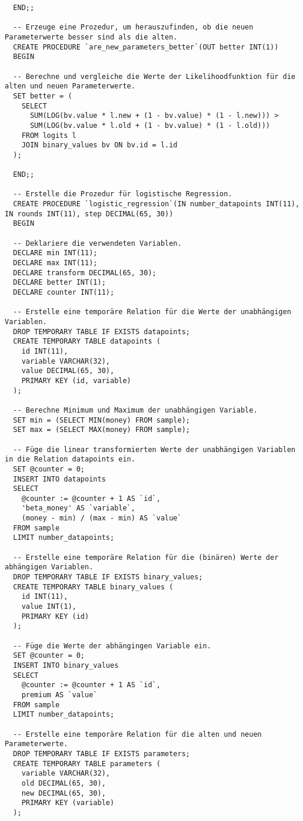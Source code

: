 \begin{verbatim}
  END;;

  -- Erzeuge eine Prozedur, um herauszufinden, ob die neuen Parameterwerte besser sind als die alten.
  CREATE PROCEDURE `are_new_parameters_better`(OUT better INT(1))
  BEGIN

  -- Berechne und vergleiche die Werte der Likelihoodfunktion für die alten und neuen Parameterwerte.
  SET better = (
    SELECT
      SUM(LOG(bv.value * l.new + (1 - bv.value) * (1 - l.new))) >
      SUM(LOG(bv.value * l.old + (1 - bv.value) * (1 - l.old)))
    FROM logits l
    JOIN binary_values bv ON bv.id = l.id
  );

  END;;

  -- Erstelle die Prozedur für logistische Regression.
  CREATE PROCEDURE `logistic_regression`(IN number_datapoints INT(11), IN rounds INT(11), step DECIMAL(65, 30))
  BEGIN

  -- Deklariere die verwendeten Variablen.
  DECLARE min INT(11);
  DECLARE max INT(11);
  DECLARE transform DECIMAL(65, 30);
  DECLARE better INT(1);
  DECLARE counter INT(11);

  -- Erstelle eine temporäre Relation für die Werte der unabhängigen Variablen.
  DROP TEMPORARY TABLE IF EXISTS datapoints;
  CREATE TEMPORARY TABLE datapoints (
    id INT(11),
    variable VARCHAR(32),
    value DECIMAL(65, 30),
    PRIMARY KEY (id, variable)
  );

  -- Berechne Minimum und Maximum der unabhängigen Variable.
  SET min = (SELECT MIN(money) FROM sample);
  SET max = (SELECT MAX(money) FROM sample);

  -- Füge die linear transformierten Werte der unabhängigen Variablen in die Relation datapoints ein.
  SET @counter = 0;
  INSERT INTO datapoints
  SELECT
    @counter := @counter + 1 AS `id`,
    'beta_money' AS `variable`,
    (money - min) / (max - min) AS `value`
  FROM sample
  LIMIT number_datapoints;

  -- Erstelle eine temporäre Relation für die (binären) Werte der abhängigen Variablen.
  DROP TEMPORARY TABLE IF EXISTS binary_values;
  CREATE TEMPORARY TABLE binary_values (
    id INT(11),
    value INT(1),
    PRIMARY KEY (id)
  );

  -- Füge die Werte der abhängingen Variable ein.
  SET @counter = 0;
  INSERT INTO binary_values
  SELECT
    @counter := @counter + 1 AS `id`,
    premium AS `value`
  FROM sample
  LIMIT number_datapoints;

  -- Erstelle eine temporäre Relation für die alten und neuen Parameterwerte.
  DROP TEMPORARY TABLE IF EXISTS parameters;
  CREATE TEMPORARY TABLE parameters (
    variable VARCHAR(32),
    old DECIMAL(65, 30),
    new DECIMAL(65, 30),
    PRIMARY KEY (variable)
  );


\end{verbatim}
